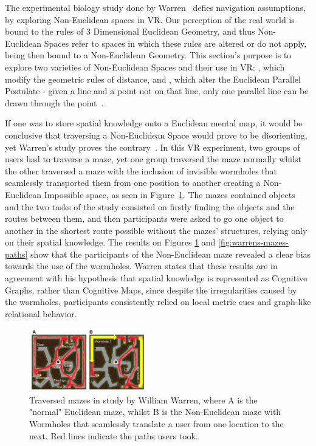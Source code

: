 The experimental biology study done by Warren~\cite{Warren2019} defies navigation assumptions, by exploring Non-Euclidean spaces in \gls{VR}. 
Our perception of the real world is bound to the rules of 3 Dimensional Euclidean Geometry, and thus Non-Euclidean Spaces refer to spaces 
in which these rules are altered or do not apply, being then bound to a Non-Euclidean Geometry. This section's purpose is to explore 
two varieties of Non-Euclidean Spaces and their use in \gls{VR}: , which modify the geometric rules of distance, 
and , which alter the Euclidean Parallel Postulate - given a line and a point not on that line, 
only one parallel line can be drawn through the point~\cite{Pisani2019}.

If one was to store spatial knowledge onto a Euclidean mental map, it would be conclusive that traversing a Non-Euclidean Space would prove to be 
disorienting, yet Warren's study proves the contrary~\cite{Warren2019}. In this \gls{VR} experiment, two groups of users had to traverse a maze, yet one group traversed the maze normally
whilst the other traversed a maze with the inclusion of invisible wormholes that seamlessly transported them from one position to another creating
a Non-Euclidean Impossible space, as seen in Figure~\ref{fig:warrens-mazes}. The mazes contained objects and the two tasks of the study  
consisted on firstly finding the objects and the routes between them, and then participants were asked to go one object to another in the shortest 
route possible without the mazes' structures, 
relying only on their spatial knowledge. The results on Figures \ref{fig:warrens-mazes} and \ref{fig:warrens-mazes-paths} show that 
the participants of the Non-Euclidean maze revealed a clear bias towards the use of the wormholes. Warren states that these results are in agreement 
with his hypothesis that spatial knowledge is represented as Cognitive Graphs, rather than Cognitive Maps, since despite the irregularities 
caused by the wormholes, participants consistently relied on local metric cues and graph-like relational behavior. 


\begin{figure}[t]
    \centering
    \includegraphics[width=0.45\textwidth]{NOVAthesisFiles/Images/papers/warrens-mazes.png}
    \caption[Map of the traversed mazes in the study by William Warren]{Traversed mazes in study by William Warren, 
    where A is the "normal" Euclidean maze, whilst B is the Non-Euclidean maze with Wormholes that seamlessly
    translate a user from one location to the next. Red lines indicate the paths users took. ~\cite{Warren2019}}
    \label{fig:warrens-mazes}
\end{figure}


